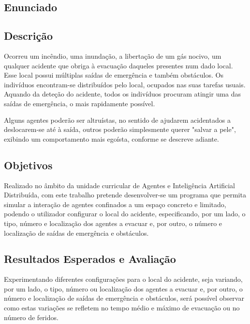 \documentclass[12pt]{article}
\begin{document}
\begin{titlepage}
\newpage

\section{Enunciado}

\subsection{Descrição}

Ocorreu um incêndio, uma inundação, a libertação de um gás nocivo, um qualquer acidente que obriga à evacuação daqueles presentes num dado local. Esse local possui múltiplas saídas de emergência e também obstáculos. Os indivíduos encontram-se distribuídos pelo local, ocupados nas suas tarefas usuais. Aquando da deteção do acidente, todos os indivíduos procuram atingir uma das saídas de emergência, o mais rapidamente possível.

Alguns agentes poderão ser altruístas, no sentido de ajudarem acidentados a deslocarem-se até à saída, outros poderão simplesmente querer "salvar a pele", exibindo um comportamento mais egoísta, conforme se descreve adiante.


\subsection{Objetivos}

Realizado no âmbito da unidade curricular de Agentes e Inteligência Artificial Distribuída, com este trabalho pretende desenvolver-se um programa que permita simular a interação de agentes confinados a um espaço concreto e limitado, podendo o utilizador configurar o local do acidente, especificando, por um lado, o tipo, número e localização dos agentes a evacuar e, por outro, o número e localização de saídas de emergência e obstáculos.


\subsection{Resultados Esperados e Avaliação}

Experimentando diferentes configurações para o local do acidente, seja variando, por um lado, o tipo, número ou localização dos agentes a evacuar e, por outro, o número e localização de saídas de emergência e obstáculos, será possível observar como estas variações se refletem no tempo médio e máximo de evacuação ou no número de feridos.


\end{titlepage}
\end{document}

